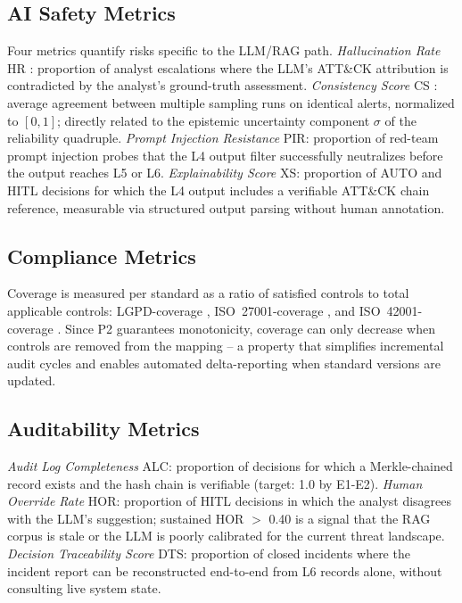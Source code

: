 \documentclass[journal]{IEEEtran}
\begin{document}
\subsection{AI Safety Metrics}
Four metrics quantify risks specific to the LLM/RAG path.
\emph{Hallucination Rate} HR \cite{ji2023hallucination}: proportion of analyst escalations
where the LLM's ATT\&CK attribution is contradicted by the analyst's ground-truth assessment.
\emph{Consistency Score} CS \cite{manakul2023selfcheckgpt}: average agreement between
multiple sampling runs on identical alerts, normalized to $[0,1]$; directly related to
the epistemic uncertainty component $\sigma$ of the reliability quadruple.
\emph{Prompt Injection Resistance} PIR: proportion of red-team prompt injection probes
\cite{greshake2023indirect} that the L4 output filter successfully neutralizes before
the output reaches L5 or L6.
\emph{Explainability Score} XS: proportion of AUTO and HITL decisions for which the L4
output includes a verifiable ATT\&CK chain reference, measurable via structured output
parsing without human annotation.

\subsection{Compliance Metrics}
Coverage is measured per standard as a ratio of satisfied controls to total applicable
controls: LGPD-coverage \cite{lgpd2018,anpd15}, ISO~27001-coverage \cite{iso27001},
and ISO~42001-coverage \cite{iso42001}. Since P2 guarantees monotonicity, coverage can
only decrease when controls are removed from the mapping -- a property that simplifies
incremental audit cycles and enables automated delta-reporting when standard versions
are updated.

\subsection{Auditability Metrics}
\emph{Audit Log Completeness} ALC: proportion of decisions for which a Merkle-chained
record exists and the hash chain is verifiable (target: 1.0 by E1-E2).
\emph{Human Override Rate} HOR: proportion of HITL decisions in which the analyst
disagrees with the LLM's suggestion; sustained HOR $>$ 0.40 is a signal that the
RAG corpus is stale or the LLM is poorly calibrated for the current threat landscape.
\emph{Decision Traceability Score} DTS: proportion of closed incidents where the
incident report can be reconstructed end-to-end from L6 records alone, without
consulting live system state.
\end{document}
